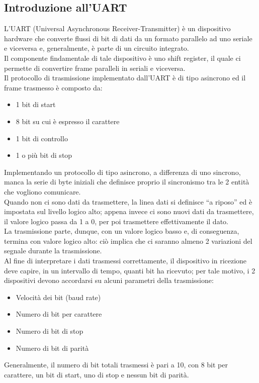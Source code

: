 \documentclass[12pt]{article}
\begin{document}
\subsection{Introduzione all'UART}
L’UART (Universal Asynchronous Receiver-Transmitter) è un dispositivo hardware che converte flussi di bit di dati da un formato parallelo ad uno seriale e viceversa e, generalmente, è parte di un circuito integrato.
\\Il componente findamentale di tale dispositivo è uno shift register, il quale ci permette di convertire frame paralleli in seriali e viceversa.
\\Il protocollo di trasmissione implementato dall’UART è di tipo asincrono ed il frame trasmesso è composto da:
\begin{itemize}
    \item 1 bit di start
    \item 8 bit su cui è espresso il carattere
    \item 1 bit di controllo
    \item 1 o più bit di stop
\end{itemize}
Implementando un protocollo di tipo asincrono, a differenza di uno sincrono, manca la serie di byte iniziali che definisce proprio il sincronismo tra le 2 entità che vogliono comunicare.
\\Quando non ci sono dati da trasmettere, la linea dati si definisce “a riposo” ed è impostata sul livello logico alto; appena invece ci sono nuovi dati da trasmettere, il valore logico passa da 1 a 0, per poi trasmettere effettivamente il dato.
\\La trasmissione parte, dunque, con un valore logico basso e, di conseguenza, termina con valore logico alto: ciò implica che ci saranno almeno 2 variazioni del segnale durante la trasmissione.
\\Al fine di interpretare i dati trasmessi correttamente, il dispositivo in ricezione deve capire, in un intervallo di tempo, quanti bit ha ricevuto; per tale motivo, i 2 dispositivi devono accordarsi su alcuni parametri della trasmissione:
\begin{itemize}
    \item Velocità dei bit (baud rate)
    \item Numero di bit per carattere
    \item Numero di bit di stop
    \item Numero di bit di parità
\end{itemize}
Generalmente, il numero di bit totali trasmessi è pari a 10, con 8 bit per carattere, un bit di start, uno di stop e nessun bit di parità.
\end{document}
